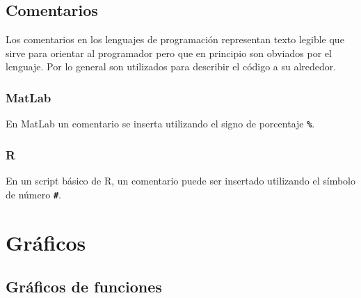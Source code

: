 \documentclass[
]{book}
\begin{document}
\hypertarget{comentarios}{%
\section{Comentarios}\label{comentarios}}

Los comentarios en los lenguajes de programación representan texto legible que sirve para orientar al programador pero que en principio son obviados por el lenguaje. Por lo general son utilizados para describir el código a su alrededor.

\hypertarget{matlab-1}{%
\subsection{MatLab}\label{matlab-1}}

En MatLab un comentario se inserta utilizando el signo de porcentaje \textbf{\texttt{\%}}.

\hypertarget{r-1}{%
\subsection{R}\label{r-1}}

En un script básico de R, un comentario puede ser insertado utilizando el símbolo de número \textbf{\texttt{\#}}.

\hypertarget{gruxe1ficos}{%
\chapter{Gráficos}\label{gruxe1ficos}}

\hypertarget{gruxe1ficos-de-funciones}{%
\section{Gráficos de funciones}\label{gruxe1ficos-de-funciones}}

  
\end{document}
